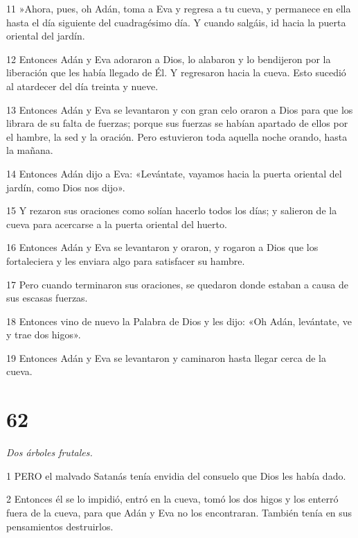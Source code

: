 \par 11 »Ahora, pues, oh Adán, toma a Eva y regresa a tu cueva, y permanece en ella hasta el día siguiente del cuadragésimo día. Y cuando salgáis, id hacia la puerta oriental del jardín.

\par 12 Entonces Adán y Eva adoraron a Dios, lo alabaron y lo bendijeron por la liberación que les había llegado de Él. Y regresaron hacia la cueva. Esto sucedió al atardecer del día treinta y nueve.

\par 13 Entonces Adán y Eva se levantaron y con gran celo oraron a Dios para que los librara de su falta de fuerzas; porque sus fuerzas se habían apartado de ellos por el hambre, la sed y la oración. Pero estuvieron toda aquella noche orando, hasta la mañana.

\par 14 Entonces Adán dijo a Eva: «Levántate, vayamos hacia la puerta oriental del jardín, como Dios nos dijo».

\par 15 Y rezaron sus oraciones como solían hacerlo todos los días; y salieron de la cueva para acercarse a la puerta oriental del huerto.

\par 16 Entonces Adán y Eva se levantaron y oraron, y rogaron a Dios que los fortaleciera y les enviara algo para satisfacer su hambre.

\par 17 Pero cuando terminaron sus oraciones, se quedaron donde estaban a causa de sus escasas fuerzas.

\par 18 Entonces vino de nuevo la Palabra de Dios y les dijo: «Oh Adán, levántate, ve y trae dos higos».

\par 19 Entonces Adán y Eva se levantaron y caminaron hasta llegar cerca de la cueva.

\chapter{62}

\par \textit{Dos árboles frutales.}

\par 1 PERO el malvado Satanás tenía envidia del consuelo que Dios les había dado.

\par 2 Entonces él se lo impidió, entró en la cueva, tomó los dos higos y los enterró fuera de la cueva, para que Adán y Eva no los encontraran. También tenía en sus pensamientos destruirlos.

